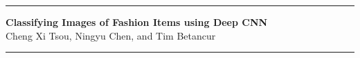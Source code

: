 \documentclass[twoside,twocolumn,9pt]{article}
\begin{document}
\newcommand{\topfigrule}{\vspace*{-1pt}%
\noindent{\color{cream}\rule[-\figrulesep]{\columnwidth}{1.5pt}} }

\newcommand{\botfigrule}{\vspace*{-2pt}%
\noindent{\color{cream}\rule[\figrulesep]{\columnwidth}{1.5pt}} }

\newcommand{\dblfigrule}{\vspace*{-1pt}%
\noindent{\color{cream}\rule[-\figrulesep]{\textwidth}{1.5pt}} }

\makeatother

\begin{@twocolumnfalse}
\vspace{1em}
\sffamily

\hrule
\vspace{2em}
\noindent\centering\LARGE{\textbf{Classifying Images of Fashion Items using Deep CNN}} \\%
\vspace{1em}
\noindent\large{Cheng Xi Tsou, Ningyu Chen, and Tim Betancur}\\%
\vspace{2em}
\hrule
\vspace{1em}

\end{@twocolumnfalse}
\vspace{0.6cm}


\renewcommand*\rmdefault{bch}\normalfont\upshape
\rmfamily
\section*{}
\vspace{-1cm}






\end{document}
